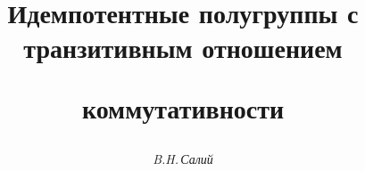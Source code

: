 









\newcommand{\Ker}{\operatorname{Ker}}


\newcommand{\tts}[1]{}







\setcounter{page}{64}















\author{\it B.H.\,Салий}




\title{Идемпотентные полугруппы с транзитивным отношением


коммутативности}





\date{}




\pagestyle{plain} %







\maketitle


\label{begin}











